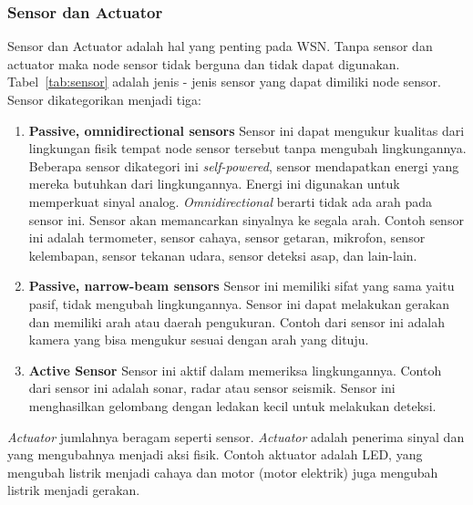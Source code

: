 \subsubsection{Sensor dan Actuator}
Sensor dan Actuator adalah hal yang penting pada WSN. Tanpa sensor dan actuator maka node sensor tidak berguna dan tidak dapat digunakan. Tabel~\ref{tab:sensor} adalah jenis - jenis sensor yang dapat dimiliki node sensor. Sensor dikategorikan menjadi tiga:
\begin{enumerate}
	\item \textbf{Passive, omnidirectional sensors} Sensor ini dapat mengukur kualitas dari lingkungan fisik tempat node sensor tersebut tanpa mengubah lingkungannya. Beberapa sensor dikategori ini \textit{self-powered}, sensor mendapatkan energi yang mereka butuhkan dari lingkungannya. Energi ini digunakan untuk memperkuat sinyal analog. \textit{Omnidirectional} berarti tidak ada arah pada sensor ini. Sensor akan memancarkan sinyalnya ke segala arah. Contoh sensor ini adalah termometer, sensor cahaya, sensor getaran, mikrofon, sensor kelembapan, sensor tekanan udara, sensor deteksi asap, dan lain-lain.
	\item \textbf{Passive, narrow-beam sensors} Sensor ini memiliki sifat yang sama yaitu pasif, tidak mengubah lingkungannya. Sensor ini dapat melakukan gerakan dan memiliki arah atau daerah pengukuran. Contoh dari sensor ini adalah kamera yang bisa mengukur sesuai dengan arah yang dituju.
	\item \textbf{Active Sensor} Sensor ini aktif dalam memeriksa lingkungannya. Contoh dari sensor ini adalah sonar, radar atau sensor seismik. Sensor ini menghasilkan gelombang dengan ledakan kecil untuk melakukan deteksi.
\end{enumerate}

\textit{Actuator} jumlahnya beragam seperti sensor. \textit{Actuator} adalah penerima sinyal dan yang mengubahnya menjadi aksi fisik. Contoh aktuator adalah LED, yang mengubah listrik menjadi cahaya dan motor (motor elektrik) juga mengubah listrik menjadi gerakan.

